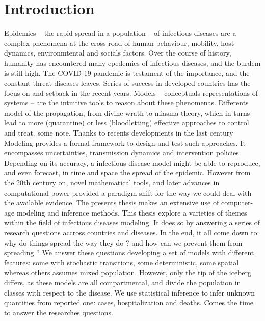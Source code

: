 \chapter{Introduction}
Epidemics -- the rapid spread in a population -- of infectious diseases are a complex phenomena at the cross road of human behaviour, mobility, host dynamics, environmtental and socials factors. 
Over the course of history, humanity has encountered many epedemics of infectious diseases, and the burdem is still high.  The COVID-19 pandemic is testament of the importance, and the constant threat diseases leaves.
Series of success in developed countries has the focus on and setback in the recent years. Models -- conceptuals representations of systems -- are the intuitive tools to reason about these phenomenas. Differents model of the propagation, from divine wrath to miasma theory, which in turns lead to more (quarantine) or less (bloodletting) effective approaches to control and treat. some note.
Thanks to recents developments in the last century 
Modeling provides a formal framework to design and test such approaches. It encompasses uncertainties, transmission dynamics and intervention policies. Depending on its accuracy, a infectious disease model might be able to reproduce, and even forecast, in time and space the spread of the epidemic. However from the 20th century on, novel mathematical tools, and later advances in computational power provided a paradigm shift for the way we could deal with the available evidence. The presents thesis makes an extensive use of computer-age modeling and inference methods. 
This thesis explore a varieties of themes within the field of infectious diseases modeling. It does so by answering a series of research questions accross countries and diseases. In the end, it all come down to: why do things spread the way they do ? and how can we prevent them from spreading ?
We answer these questions developing a set of models with different features: some with stochastic transitions, some deterministic, some spatial whereas others assumes mixed population. However, only the tip of the iceberg differs, as these models are all compartmental, and divide the population in classes with respect to the disease. We use statistical inference to infer unknown quantities from reported one: cases, hospitalization and deaths. Comes the time to answer the researches questions.
